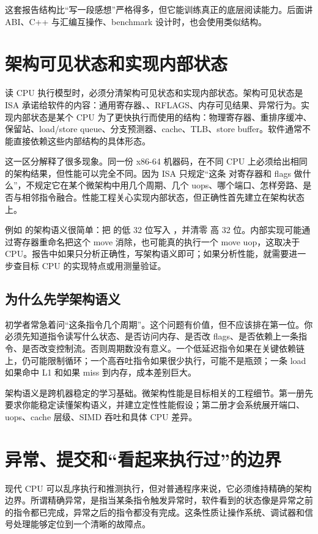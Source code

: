 这套报告结构比“写一段感想”严格得多，但它能训练真正的底层阅读能力。后面讲 ABI、C++ 与汇编互操作、benchmark 设计时，也会使用类似结构。

\section{架构可见状态和实现内部状态}

读 CPU 执行模型时，必须分清架构可见状态和实现内部状态。架构可见状态是 ISA 承诺给软件的内容：通用寄存器、、RFLAGS、内存可见结果、异常行为。实现内部状态是某个 CPU 为了更快执行而使用的结构：物理寄存器、重排序缓冲、保留站、load/store queue、分支预测器、cache、TLB、store buffer。软件通常不能直接依赖这些内部结构的具体形态。

这一区分解释了很多现象。同一份 x86-64 机器码，在不同 CPU 上必须给出相同的架构结果，但性能可以完全不同。因为 ISA 只规定“这条  对寄存器和 flags 做什么”，不规定它在某个微架构中用几个周期、几个 uops、哪个端口、怎样旁路、是否与相邻指令融合。性能工程关心实现内部状态，但正确性首先建立在架构状态上。

例如  的架构语义很简单：把  的低 32 位写入 ，并清零  高 32 位。内部实现可能通过寄存器重命名把这个 move 消除，也可能真的执行一个 move uop，这取决于 CPU。报告中如果只分析正确性，写架构语义即可；如果分析性能，就需要进一步查目标 CPU 的实现特点或用测量验证。

\subsection{为什么先学架构语义}

初学者常急着问“这条指令几个周期”。这个问题有价值，但不应该排在第一位。你必须先知道指令读写什么状态、是否访问内存、是否改 flags、是否依赖上一条指令、是否改变控制流。否则周期数没有意义。一个低延迟指令如果在关键依赖链上，仍可能限制循环；一个高吞吐指令如果很少执行，可能不是瓶颈；一条 load 如果命中 L1 和如果 miss 到内存，成本差别巨大。

架构语义是跨机器稳定的学习基础。微架构性能是目标相关的工程细节。第一册先要求你能稳定读懂架构语义，并建立定性性能假设；第二册才会系统展开端口、uops、cache 层级、SIMD 吞吐和具体 CPU 差异。

\section{异常、提交和“看起来执行过”的边界}

现代 CPU 可以乱序执行和推测执行，但对普通程序来说，它必须维持精确的架构边界。所谓精确异常，是指当某条指令触发异常时，软件看到的状态像是异常之前的指令都已完成，异常之后的指令都没有完成。这条性质让操作系统、调试器和信号处理能够定位到一个清晰的故障点。

